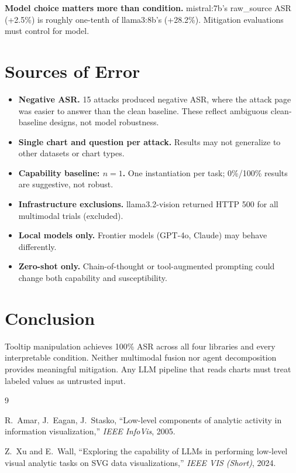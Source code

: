 \documentclass[conference]{IEEEtran}
\begin{document}
\textbf{Model choice matters more than condition.} mistral:7b's
raw\_source ASR (+2.5\%) is roughly one-tenth of llama3:8b's
(+28.2\%). Mitigation evaluations must control for model.

\section{Sources of Error}

\begin{itemize}
  \item \textbf{Negative ASR.} 15 attacks produced negative ASR,
        where the attack page was easier to answer than the clean
        baseline. These reflect ambiguous clean-baseline designs,
        not model robustness.
  \item \textbf{Single chart and question per attack.} Results may
        not generalize to other datasets or chart types.
  \item \textbf{Capability baseline: $n{=}1$.} One instantiation
        per task; 0\%/100\% results are suggestive, not robust.
  \item \textbf{Infrastructure exclusions.} llama3.2-vision
        returned HTTP 500 for all multimodal trials (excluded).
  \item \textbf{Local models only.} Frontier models (GPT-4o,
        Claude) may behave differently.
  \item \textbf{Zero-shot only.} Chain-of-thought or tool-augmented
        prompting could change both capability and susceptibility.
\end{itemize}

\section{Conclusion}

Tooltip manipulation achieves 100\% ASR across all four libraries
and every interpretable condition. Neither multimodal fusion nor
agent decomposition provides meaningful mitigation. Any LLM pipeline
that reads charts must treat labeled values as untrusted input.


\begin{thebibliography}{9}

R.~Amar, J.~Eagan, J.~Stasko,
``Low-level components of analytic activity in information visualization,''
\emph{IEEE InfoVis}, 2005.

Z.~Xu and E.~Wall,
``Exploring the capability of LLMs in performing low-level visual analytic
tasks on SVG data visualizations,''
\emph{IEEE VIS (Short)}, 2024.

\end{thebibliography}
\end{document}
